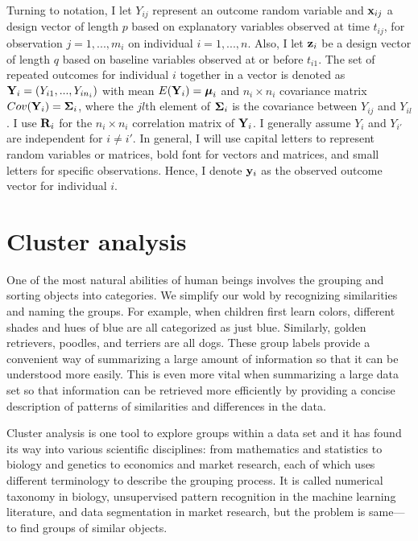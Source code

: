 Turning to notation, I let $Y_{ij}$ represent an outcome random variable and $\mathbf x_{ij}$ a design vector of length $p$ based on explanatory variables observed at time $t_{ij}$, for observation $j=1,...,m_{i}$ on individual $i=1,...,n$. Also, I let $\mathbf z_{i}$ be a design vector of length $q$ based on baseline variables observed at or before $t_{i1}$. The set of repeated outcomes for individual $i$ together in a vector is denoted as $\mathbf Y_{i} = (Y_{i1},...,Y_{in_{i}})$ with mean $E(\mathbf Y_{i}) = \boldsymbol\mu_{i}$ and $n_{i}\times n_{i}$ covariance matrix $Cov(\mathbf Y_{i}) = \boldsymbol\Sigma_{i}$, where the $jl$th element of $\boldsymbol\Sigma_{i}$ is the covariance between $Y_{ij}$ and $Y_{il}$. I use $\mathbf R_{i}$ for the $n_{i}\times n_{i}$ correlation matrix of $\mathbf Y_{i}$. I generally assume $Y_{i}$ and $Y_{i'}$ are independent for $i\not = i'$. In general, I will use capital letters to represent random variables or matrices, bold font for vectors and matrices, and small letters for specific observations. Hence, I denote $\mathbf y_{i}$ as the observed outcome vector for individual $i$. 

\section{Cluster analysis}
One of the most natural abilities of human beings involves the grouping and sorting objects into categories. We simplify our wold by recognizing similarities and naming the groups. For example, when children first learn colors, different shades and hues of blue are all categorized as just blue. Similarly, golden retrievers, poodles, and terriers are all dogs. These group labels provide a convenient way of summarizing a large amount of information so that it can be understood more easily. This is even more vital when summarizing a large data set so that information can be retrieved more efficiently by providing a concise description of patterns of similarities and differences in the data. 

Cluster analysis is one tool to explore groups within a data set and it has found its way into various scientific disciplines: from mathematics and statistics to biology and genetics to economics and market research, each of which uses different terminology to describe the grouping process. It is called numerical taxonomy in biology, unsupervised pattern recognition in the machine learning literature, and data segmentation in market research, but the problem is same---to find groups of similar objects.
 
